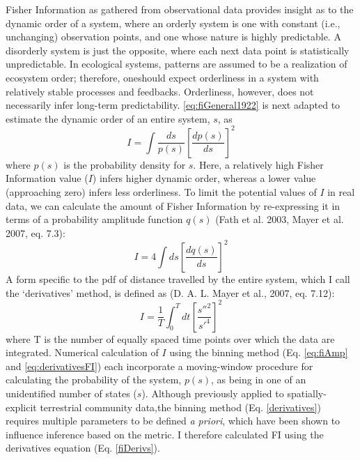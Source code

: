 \documentclass[12pt,twoside,openany]{reedthesis}
\begin{document}
Fisher Information as gathered from observational data provides insight
as to the dynamic order of a system, where an orderly system is one with
constant (i.e., unchanging) observation points, and one whose nature is
highly predictable. A disorderly system is just the opposite, where each
next data point is statistically unpredictable. In ecological systems,
patterns are assumed to be a realization of ecosystem order; therefore,
oneshould expect orderliness in a system with relatively stable
processes and feedbacks. Orderliness, however, does not necessarily
infer long-term predictability. \eqref{eq:fiGeneral1922} is next adapted
to estimate the dynamic order of an entire system, \(s\), as
\begin{equation} 
  I = \int \frac{ds}{p(s)}\left[\frac{dp(s)}{ds}\right]^2
\end{equation}
where \(p(s)\) is the probability density for \(s\). Here, a relatively
high Fisher Information value (\(I\)) infers higher dynamic order,
whereas a lower value (approaching zero) infers less orderliness. To
limit the potential values of \(I\) in real data, we can calculate the
amount of Fisher Information by re-expressing it in terms of a
probability amplitude function \(q(s)\) (Fath et al. 2003, Mayer et al.
2007, eq. 7.3):
\begin{equation}
  I = 4 \int ds\left[\frac{dq(s)}{ds}\right]^2
  \label{eq:fiAmp}
\end{equation}
A form specific to the pdf of distance travelled by the entire system,
which I call the `derivatives' method, is defined as (D. A. L. Mayer et
al., 2007, eq. 7.12):
\begin{equation}
  I = \frac{1}{T} \int_0^T dt\left[\frac{s''^2}{s'^4}\right]^2
  \label{eq:fiDerivs}
\end{equation}
where T is the number of equally spaced time points over which the data
are integrated. Numerical calculation of \(I\) using the binning method
(Eq. \eqref{eq:fiAmp} and \eqref{eq:derivativesFI}) each incorporate a
moving-window procedure for calculating the probability of the system,
\(p(s)\), as being in one of an unidentified number of states (\(s\)).
Although previously applied to spatially-explicit terrestrial community
data,the binning method (Eq. \ref{derivatives}) requires multiple
parameters to be defined \emph{a priori}, which have been shown to
influence inference based on the metric. I therefore calculated FI using
the derivatives equation (Eq. \ref{fiDerivs}).
\end{document}
